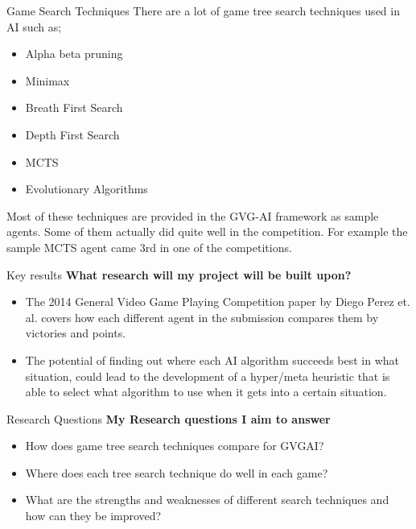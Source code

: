 \documentclass{beamer}
\begin{document}
\begin{frame}{Game Search Techniques}
		There are a lot of game tree search techniques used in AI such as; 
			\begin{itemize}
			\item Alpha beta pruning \pause
			\item Minimax \pause
			\item Breath First Search \pause
			\item Depth First Search \pause
			\item MCTS \pause
			\item Evolutionary Algorithms \pause
		\end{itemize}
		Most of these techniques are provided in the GVG-AI framework as sample agents. Some of them actually did quite well in the competition. \pause
		For example the sample MCTS agent came 3rd in one of the competitions. 
\end{frame}


\begin{frame}{Key results}
	\textbf{What research will my project will be built upon?}
	\begin{itemize}
		\item	The 2014 General Video Game Playing Competition paper by Diego Perez et. al. covers how each different agent in the submission compares them by victories and points. \pause
		
		\item	The potential of finding out where each AI algorithm succeeds best in what situation, could lead to the development of a hyper/meta heuristic that is able to select what algorithm to use when it gets into a certain situation.
		\end{itemize}
\end{frame}


\begin{frame}{Research Questions}
	\textbf{My Research questions I aim to answer}
	\begin{itemize}
    \item How does game tree search techniques compare for GVGAI? \pause
    \item Where does each tree search technique do well in each game? \pause 
    \item What are the strengths and weaknesses of different search techniques and how can they be improved? \pause
	\end{itemize}
\end{frame}
\end{document}
